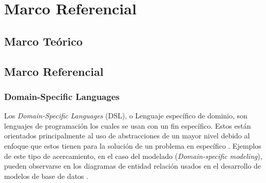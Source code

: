 \section{Marco Referencial}

\subsection{Marco Teórico}

\subsection{Marco Referencial}

\subsubsection{Domain-Specific Languages} %



Los \textit{Domain-Specific Languages} (DSL), o Lenguaje específico de dominio, son lenguajes de programación los cuales se usan con un fin específico. Estos están orientados principalmente al uso de abstracciones de un mayor nivel debido al enfoque que estos tienen para la solución de un problema en específico \cite{Kelly2008}. Ejemplos de este tipo de acercamiento, en el caso del modelado (\textit{Domain-specific modeling}), pueden observarse en los diagramas de entidad relación usados en el desarrollo de modelos de base de datos \cite{Celikovic2014ADF}. 



